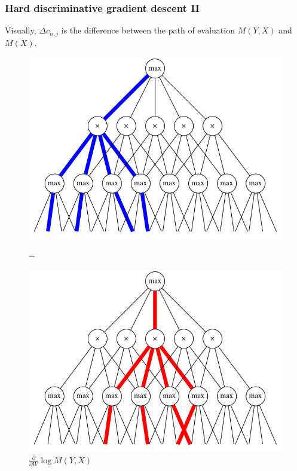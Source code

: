 \documentclass[usenames,dvipsnames]{beamer}
\newcommand{\ddspn}[2]{\frac{\partial#1}{\partial#2}}
\begin{document}
\begin{frame}
  \frametitle{Hard discriminative gradient descent II}

  Visually, $\Delta c_{n,j}$ is the difference between the path of evaluation $M(Y, X)$ and $M(X)$.

  \begin{figure}[h]
    \centering
    \begin{minipage}{0.3\textwidth}
      \includegraphics[width=\linewidth]{imgs/hard_diff_0.png}
      \captionsetup{justification=centering}
      \caption*{$\ddspn{}{W}\log M(Y,X)$}
    \end{minipage}
    $-$
    \begin{minipage}{0.3\textwidth}
      \includegraphics[width=\linewidth]{imgs/hard_diff_1.png}
      \captionsetup{justification=centering}

\end{minipage}
\end{figure}
\end{frame}
\end{document}
